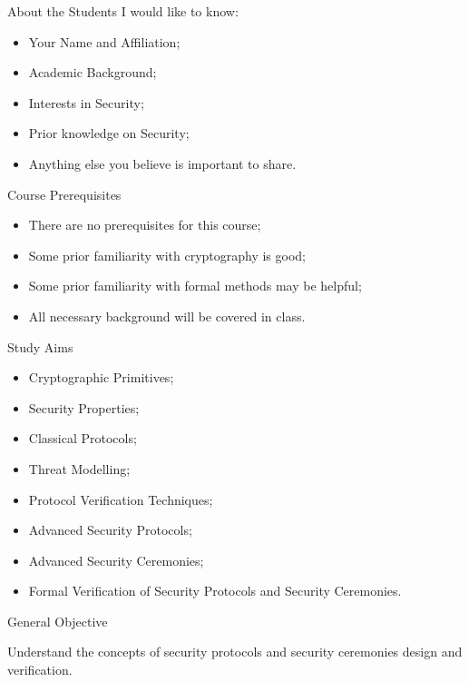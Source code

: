 \documentclass[12pt]{beamer}
\begin{document}
\begin{frame}{About the Students}
I would like to know:
\begin{itemize}
\item Your Name and Affiliation;\pause
\item Academic Background;\pause
\item Interests in Security;\pause
\item Prior knowledge on Security;\pause
\item Anything else you believe is important to share.
\end{itemize}
\end{frame}


\begin{frame}{Course Prerequisites}
\begin{itemize}
\item There are no prerequisites for this course;\pause
\item Some prior familiarity with cryptography is good;\pause
\item Some prior familiarity with formal methods may be helpful;\pause
\item All necessary background will be covered in class.
\end{itemize}
\end{frame}

\begin{frame}{Study Aims}
\begin{itemize}
\item Cryptographic Primitives;\pause
\item Security Properties;\pause
\item Classical Protocols;\pause
\item Threat Modelling;\pause
\item Protocol Verification Techniques;\pause
\item Advanced Security Protocols;\pause
\item Advanced Security Ceremonies;\pause
\item Formal Verification of Security Protocols and Security Ceremonies.
\end{itemize}
\end{frame}

\begin{frame}{General Objective}

{\Large Understand the concepts of security protocols and security ceremonies design and verification.}

\end{frame}
\end{document}
